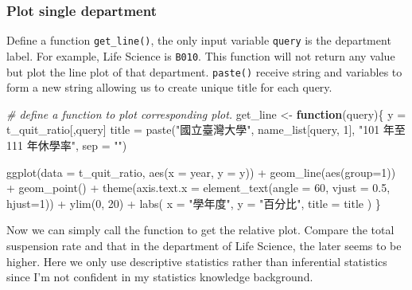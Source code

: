 \documentclass[
]{article}
\newenvironment{Shaded}{\begin{snugshade}}{\end{snugshade}}
\newcommand{\AttributeTok}[1]{\textcolor[rgb]{0.77,0.63,0.00}{#1}}
\newcommand{\CommentTok}[1]{\textcolor[rgb]{0.56,0.35,0.01}{\textit{#1}}}
\newcommand{\ControlFlowTok}[1]{\textcolor[rgb]{0.13,0.29,0.53}{\textbf{#1}}}
\newcommand{\DecValTok}[1]{\textcolor[rgb]{0.00,0.00,0.81}{#1}}
\newcommand{\FloatTok}[1]{\textcolor[rgb]{0.00,0.00,0.81}{#1}}
\newcommand{\FunctionTok}[1]{\textcolor[rgb]{0.00,0.00,0.00}{#1}}
\newcommand{\NormalTok}[1]{#1}
\newcommand{\OtherTok}[1]{\textcolor[rgb]{0.56,0.35,0.01}{#1}}
\newcommand{\SpecialCharTok}[1]{\textcolor[rgb]{0.00,0.00,0.00}{#1}}
\newcommand{\StringTok}[1]{\textcolor[rgb]{0.31,0.60,0.02}{#1}}
\begin{document}
\hypertarget{plot-single-department}{%
\subsubsection{Plot single department}\label{plot-single-department}}

Define a function \texttt{get\_line()}, the only input variable
\texttt{query} is the department label. For example, Life Science is
\texttt{B010}. This function will not return any value but plot the line
plot of that department. \texttt{paste()} receive string and variables
to form a new string allowing us to create unique title for each query.

\begin{Shaded}
\begin{Highlighting}[]
\CommentTok{\# define a function to plot corresponding plot.}
\NormalTok{get\_line }\OtherTok{\textless{}{-}} \ControlFlowTok{function}\NormalTok{(query)\{}
\NormalTok{y }\OtherTok{=}\NormalTok{ t\_quit\_ratio[,query]}
\NormalTok{    title }\OtherTok{=} \FunctionTok{paste}\NormalTok{(}\StringTok{"國立臺灣大學"}\NormalTok{, name\_list[query, }\DecValTok{1}\NormalTok{], }
                  \StringTok{"101 年至 111 年休學率"}\NormalTok{, }\AttributeTok{sep =} \StringTok{""}\NormalTok{)}
    
    \FunctionTok{ggplot}\NormalTok{(}\AttributeTok{data =}\NormalTok{ t\_quit\_ratio, }\FunctionTok{aes}\NormalTok{(}\AttributeTok{x =}\NormalTok{ year, }\AttributeTok{y =}\NormalTok{ y)) }\SpecialCharTok{+} 
        \FunctionTok{geom\_line}\NormalTok{(}\FunctionTok{aes}\NormalTok{(}\AttributeTok{group=}\DecValTok{1}\NormalTok{)) }\SpecialCharTok{+}
        \FunctionTok{geom\_point}\NormalTok{()  }\SpecialCharTok{+}
        \FunctionTok{theme}\NormalTok{(}\AttributeTok{axis.text.x =} \FunctionTok{element\_text}\NormalTok{(}\AttributeTok{angle =} \DecValTok{60}\NormalTok{, }\AttributeTok{vjust =} \FloatTok{0.5}\NormalTok{, }\AttributeTok{hjust=}\DecValTok{1}\NormalTok{)) }\SpecialCharTok{+}
        \FunctionTok{ylim}\NormalTok{(}\DecValTok{0}\NormalTok{, }\DecValTok{20}\NormalTok{) }\SpecialCharTok{+} 
        \FunctionTok{labs}\NormalTok{(}
            \AttributeTok{x =} \StringTok{"學年度"}\NormalTok{,}
            \AttributeTok{y =} \StringTok{"百分比"}\NormalTok{,}
            \AttributeTok{title =}\NormalTok{ title}
\NormalTok{        ) }
\NormalTok{\}}
\end{Highlighting}
\end{Shaded}

Now we can simply call the function to get the relative plot. Compare
the total suspension rate and that in the department of Life Science,
the later seems to be higher. Here we only use descriptive statistics
rather than inferential statistics since I'm not confident in my
statistics knowledge background.
\end{document}

